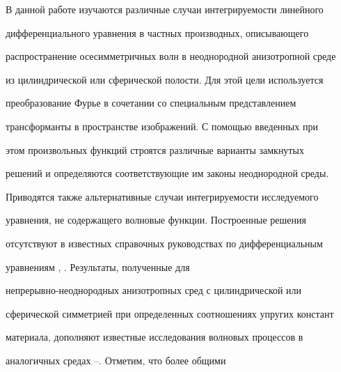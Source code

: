 

 


\pagestyle{plain} %


 


 




 


\maketitle 


\label{begin} 


 


В данной работе изучаются различные случаи интегрируемости линейного 


дифференциального уравнения в частных производных, описывающего 


распространение осесимметричных волн в неоднородной анизотропной среде 


из цилиндрической или сферической полости. Для этой цели используется 


преобразование Фурье в сочетании со специальным представлением 


трансформанты в пространстве изображений. С помощью введенных при 


этом произвольных функций строятся различные варианты замкнутых 


решений и определяются соответствующие им законы неоднородной среды. 


Приводятся также альтернативные случаи интегрируемости исследуемого 


уравнения, не содержащего волновые функции. Построенные решения 


отсутствуют в известных справочных руководствах по дифференциальным 


уравнениям \cite{1}, \cite{2}. Результаты, полученные для 


непрерывно-неоднородных анизотропных сред с цилиндрической или 


сферической симметрией при определенных соотношениях упругих констант 


материала, дополняют известные исследования волновых процессов в 


аналогичных средах \cite{3}--\cite{8}. Отметим, что более общими 


